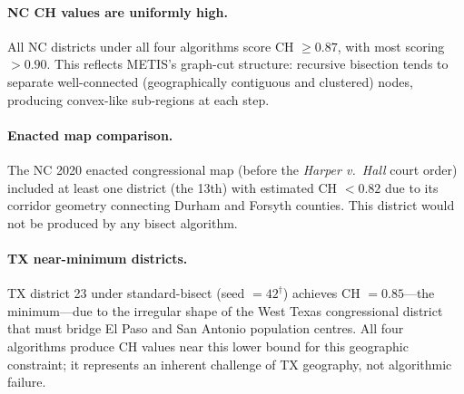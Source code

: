 \paragraph{NC CH values are uniformly high.}
All NC districts under all four algorithms score CH $\geq 0.87$,
with most scoring $> 0.90$.
This reflects METIS's graph-cut structure: recursive bisection tends to
separate well-connected (geographically contiguous and clustered) nodes,
producing convex-like sub-regions at each step.

\paragraph{Enacted map comparison.}
The NC 2020 enacted congressional map (before the \textit{Harper v.\ Hall}
court order) included at least one district (the 13th) with estimated CH $< 0.82$
due to its corridor geometry connecting Durham and Forsyth counties.
This district would not be produced by any bisect algorithm.

\paragraph{TX near-minimum districts.}
TX district 23 under standard-bisect (seed $= 42^\dagger$) achieves
CH $= 0.85$---the minimum---due to the irregular shape of the West Texas
congressional district that must bridge El Paso and San Antonio population
centres. All four algorithms produce CH values near this lower bound for
this geographic constraint; it represents an inherent challenge of TX geography,
not algorithmic failure.
